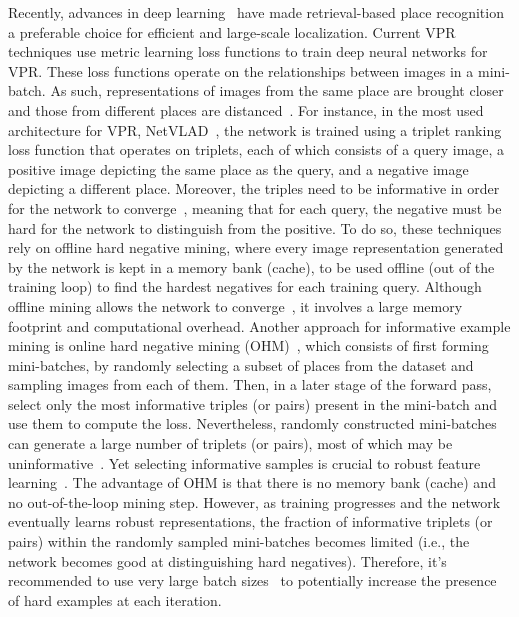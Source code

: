 \documentclass{bmvc2k}
\begin{document}
Recently, advances in deep learning~\cite{menghani2021efficient} have made retrieval-based place recognition a preferable choice for efficient and large-scale localization. Current VPR techniques \cite{arandjelovic2016netvlad, liu2019stochastic, warburg2020mapillary, thoma2020soft, zhu2020regional, hausler2021patch, wang2022transvpr} use metric learning loss functions to train deep neural networks for VPR. These loss functions operate on the relationships between images in a mini-batch. As such, representations of images from the same place are brought closer and those from different places are distanced~\cite{musgrave2020metric}. For instance, in the most used architecture for VPR, NetVLAD~\cite{arandjelovic2016netvlad, liu2019stochastic, warburg2020mapillary, hausler2021patch, wang2022transvpr}, the network is trained using a triplet ranking loss function that operates on triplets, each of which consists of a query image, a positive image depicting the same place as the query, and a negative image depicting a different place. Moreover, the triples need to be informative in order for the network to converge~\cite{hermans2017defense}, meaning that for each query, the negative must be hard for the network to distinguish from the positive. To do so, these techniques rely on offline hard negative mining, where every image representation generated by the network is kept in a memory bank (cache), to be used offline (out of the training loop) to find the hardest negatives for each training query. Although offline mining allows the network to converge~\cite{warburg2020mapillary}, it involves a large memory footprint and computational overhead.
Another approach for informative example mining is online hard negative mining (OHM)~\cite{hermans2017defense, wu2017sampling}, which consists of first forming mini-batches, by randomly selecting a subset of places from the dataset and sampling images from each of them. Then, in a later stage of the forward pass, select only the most informative triples (or pairs) present in the mini-batch and use them to compute the loss. Nevertheless, randomly constructed mini-batches can generate a large number of triplets (or pairs), most of which may be uninformative~\cite{hermans2017defense}. Yet selecting informative samples is crucial to robust feature learning~\cite{musgrave2020metric}. The advantage of OHM is that there is no memory bank (cache) and no out-of-the-loop mining step. However, as training progresses and the network eventually learns robust representations, the fraction of informative triplets (or pairs) within the randomly sampled mini-batches becomes limited (i.e., the network becomes good at distinguishing hard negatives). Therefore, it's recommended to use very large batch sizes~\cite{hermans2017defense} to potentially increase the presence of hard examples at each iteration.
\end{document}
